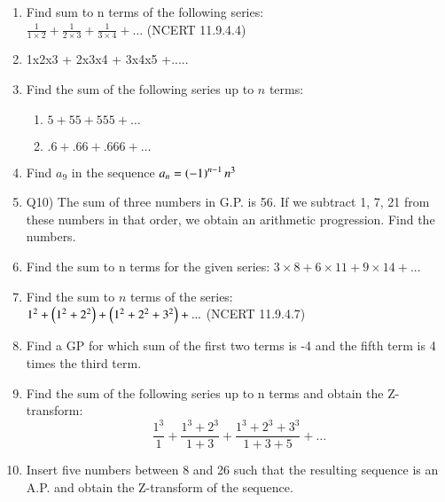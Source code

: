 \begin{enumerate}[label=\thesection.\arabic*,ref=\thesection.\theenumi]
\pagebreak
\item Find sum to n terms of the following series:\\
$\frac{1}{1 \times 2} + \frac{1}{2 \times 3} + \frac{1}{3 \times 4} + \ldots$ \hfill(NCERT 11.9.4.4)\\
\solution
 
\pagebreak
\item 1x2x3 + 2x3x4 + 3x4x5 +..... \\
\solution
\pagebreak
\item  Find the sum of the following series up to \(n\) terms:
          \begin{enumerate}
              \item $5 + 55 + 555 + \ldots$
              \item  $.6 + .66 + .666 + \ldots$
        \end{enumerate}

\solution

\pagebreak
\item Find $a_{9}$ in the sequence $a_{n}=\left(-1\right)^{n-1}n^{3}$ \\
\solution
\pagebreak


\item Q10) The sum of three numbers in G.P. is 56. If we subtract 1, 7, 21 from these numbers in that order, we obtain an arithmetic progression. Find the numbers.\\
\solution 
\pagebreak
\item  Find the sum to n terms for the given series: $3\times8 + 6\times11 + 9\times14 + ...$ \\
\solution 

\pagebreak
\item Find the sum to $n$ terms of the series:\\
$1^2+\left(1^2+2^2\right)+\left(1^2+2^2+3^2\right)+...$ \hfill(NCERT 11.9.4.7)\\
\solution

\pagebreak
\item Find a GP for which sum of the first two terms is -4 and the fifth term is 4 times the third term.\\
\solution

\pagebreak

\item Find the sum of the following series up to n terms and obtain the Z-transform: 
$$\frac{1^3}{1} + \frac{1^3 + 2^3}{1 + 3} + \frac{1^3 + 2^3 + 3^3}{1 + 3 + 5} + \ldots$$
\solution

\pagebreak
\item Insert five numbers between 8 and 26 such that the resulting sequence is an A.P. and obtain the Z-transform of the sequence. \\
\solution

\pagebreak


\end{enumerate}
